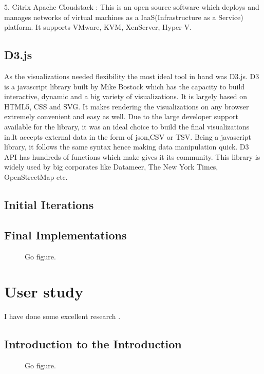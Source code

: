 \documentclass[double,12pt]{beavtex}
\begin{document}
5. Citrix Apache Cloudstack :
This is an open source software which deploys and manages networks of virtual machines as a IaaS(Infrastructure as a Service) platform. It supports VMware, KVM, XenServer, Hyper-V.




\section{D3.js}
As the visualizations needed flexibility the most ideal tool in hand was D3.js. D3 is a javascript library built by Mike Bostock which has the capacity to build interactive, dynamic and a big variety of visualizations. It is largely based on HTML5, CSS and SVG. It makes rendering the visualizations on any browser extremely convenient and easy as well. Due to the large developer support available for the library, it was an ideal choice to build the final visualizations in.It accepts external data in the form of json,CSV or TSV. Being a javascript library, it follows the same syntax hence making data manipulation quick. D3 API has hundreds of functions which make gives it its community. This library is widely used by big corporates like Datameer, The New York Times, OpenStreetMap etc.

\section{Initial Iterations}

\section{Final Implementations}

\begin{figure}[!ht]
\centering
{}
\caption{Go figure.}
\end{figure}

\chapter{User study}
I have done some excellent research \cite{matrix}.
\section{Introduction to the Introduction}
\begin{figure}[!ht]
\centering
{}
\caption{Go figure.}
\end{figure}
\end{document}
